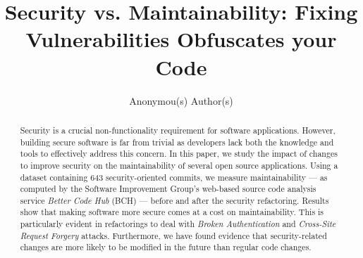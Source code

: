 \documentclass[10pt,conference]{IEEEtran}
\begin{document}
\title{Security vs. Maintainability: Fixing Vulnerabilities Obfuscates your Code%
}

\author{
    Anonymou(s) Author(s)
}

\maketitle

\begin{abstract}
  Security is a crucial non-functionality requirement for software applications.
  However, building secure software is far from trivial as developers lack both
  the knowledge and tools to effectively address this concern. In this paper, we
  study the impact of changes to improve security on the maintainability of several
  open source applications. Using a dataset containing 643 security-oriented
  commits, we measure maintainability --- as computed by the Software Improvement
  Group's web-based source code analysis service \emph{Better Code Hub} (BCH) ---
  before and after the security refactoring. Results show that making software
  more secure comes at a cost on maintainability. This is particularly evident
  in refactorings to deal with \textit{Broken Authentication} and \textit{Cross-Site Request Forgery} attacks.
  \textcolor{mypink3}{Furthermore, we have found evidence that security-related changes are more
  likely to be modified in the future than regular code changes.}
\end{abstract}
\end{document}
